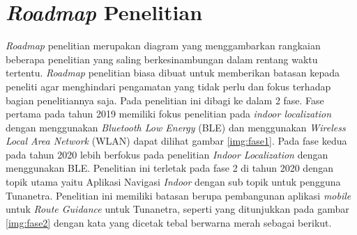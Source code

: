 \section{\textit{Roadmap} Penelitian}
\textit{Roadmap} penelitian merupakan diagram yang menggambarkan rangkaian beberapa penelitian yang saling berkesinambungan dalam rentang waktu tertentu. \textit{Roadmap} penelitian biasa dibuat untuk memberikan batasan kepada peneliti agar menghindari pengamatan yang tidak perlu dan fokus terhadap bagian penelitiannya saja. Pada penelitian ini dibagi ke dalam 2 fase. Fase pertama pada tahun 2019 memiliki fokus penelitian pada \textit{indoor localization} dengan menggunakan \textit{Bluetooth Low Energy} (BLE) dan menggunakan \textit{Wireless Local Area Network} (WLAN) dapat dilihat gambar \ref{img:fase1}. Pada fase kedua pada tahun 2020 lebih berfokus pada penelitian \textit{Indoor Localization} dengan menggunakan BLE. Penelitian ini terletak pada fase 2 di tahun 2020 dengan topik utama yaitu Aplikasi Navigasi \textit{Indoor} dengan sub topik untuk pengguna Tunanetra. Penelitian ini memiliki batasan berupa pembangunan aplikasi \textit{mobile} untuk \textit{Route Guidance} untuk Tunanetra, seperti yang ditunjukkan pada gambar \ref{img:fase2} dengan kata yang dicetak tebal berwarna merah sebagai berikut.


\begin{figure}[H]
\end{figure}

